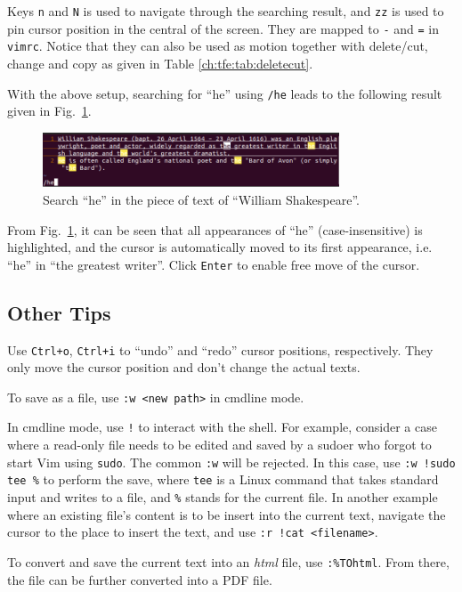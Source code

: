 Keys \verb|n| and \verb|N| is used to navigate through the searching result, and \verb|zz| is used to pin cursor position in the central of the screen. They are mapped to \verb|-| and \verb|=| in \verb|vimrc|. Notice that they can also be used as motion together with delete/cut, change and copy as given in Table \ref{ch:tfe:tab:deletecut}.

With the above setup, searching for ``he'' using \verb|/he| leads to the following result given in Fig.~\ref{ch:tfe:fig:vimdemo2}.
\begin{figure}[htbp]
\centering
\includegraphics[width=250pt]{chapters/part-1/figures/vimdemo2.png}
\caption{Search ``he'' in the piece of text of ``William Shakespeare''.} \label{ch:tfe:fig:vimdemo2}
\end{figure}
From Fig.~\ref{ch:tfe:fig:vimdemo2}, it can be seen that all appearances of ``he'' (case-insensitive) is highlighted, and the cursor is automatically moved to its first appearance, i.e. ``he'' in ``the greatest writer''. Click \verb|Enter| to enable free move of the cursor.

\subsection{Other Tips}

Use \verb|Ctrl+o|, \verb|Ctrl+i| to ``undo'' and ``redo'' cursor positions, respectively. They only move the cursor position and don't change the actual texts.

To save as a file, use \verb|:w <new path>| in cmdline mode.

In cmdline mode, use \verb|!| to interact with the shell. For example, consider a case where a read-only file needs to be edited and saved by a sudoer who forgot to start Vim using \verb|sudo|. The common \verb|:w| will be rejected. In this case, use \verb|:w !sudo tee %| to perform the save, where \verb|tee| is a Linux command that takes standard input and writes to a file, and \verb|%| stands for the current file. In another example where an existing file's content is to be insert into the current text, navigate the cursor to the place to insert the text, and use \verb|:r !cat <filename>|.

To convert and save the current text into an \textit{html} file, use \verb|:%TOhtml|. From there, the file can be further converted into a PDF file.

